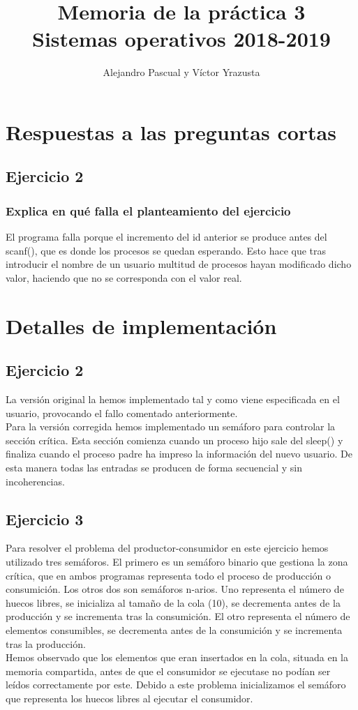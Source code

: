 \documentclass[]{article}
\title{Memoria de la práctica 3\\
	\Large Sistemas operativos 2018-2019}
\author{Alejandro Pascual y V\'ictor Yrazusta}
\begin{document}
\maketitle

\section*{Respuestas a las preguntas cortas}
\subsection*{Ejercicio 2}
\subsubsection*{Explica en qué falla el planteamiento del ejercicio}
El programa falla porque el incremento del id anterior se produce antes del scanf(), que es donde los procesos se quedan esperando. Esto hace que tras introducir el nombre de un usuario multitud de procesos hayan modificado dicho valor, haciendo que no se corresponda con el valor real. \\

\section*{Detalles de implementación}
\subsection*{Ejercicio 2}
La versión original la hemos implementado tal y como viene especificada en el usuario, provocando el fallo comentado anteriormente. \\

Para la versión corregida hemos implementado un semáforo para controlar la sección crítica. Esta sección comienza cuando un proceso hijo sale del sleep() y finaliza cuando el proceso padre ha impreso la información del nuevo usuario. De esta manera todas las entradas se producen de forma secuencial y sin incoherencias.

\subsection*{Ejercicio 3}
Para resolver el problema del productor-consumidor en este ejercicio hemos utilizado tres semáforos. El primero es un semáforo binario que gestiona la zona crítica, que en ambos programas representa todo el proceso de producción o consumición. Los otros dos son semáforos n-arios. Uno representa el número de huecos libres, se inicializa al tamaño de la cola (10), se decrementa antes de la producción y se incrementa tras la consumición. El otro representa el número de elementos consumibles, se decrementa antes de la consumición y se incrementa tras la producción. \\

Hemos observado que los elementos que eran insertados en la cola, situada en la memoria compartida, antes de que el consumidor se ejecutase no podían ser leídos correctamente por este. Debido a este problema inicializamos el semáforo
que representa los huecos libres al ejecutar el consumidor.
\end{document}
